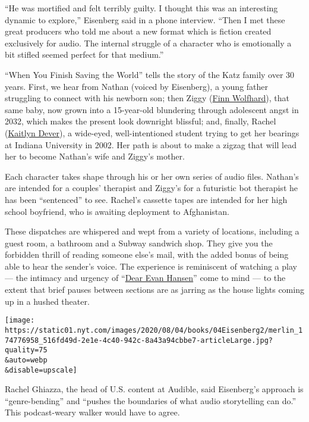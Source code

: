 ``He was mortified and felt terribly guilty. I thought this was an
interesting dynamic to explore,'' Eisenberg said in a phone interview.
``Then I met these great producers who told me about a new format which
is fiction created exclusively for audio. The internal struggle of a
character who is emotionally a bit stifled seemed perfect for that
medium.''

``When You Finish Saving the World'' tells the story of the Katz family
over 30 years. First, we hear from Nathan (voiced by Eisenberg), a young
father struggling to connect with his newborn son; then Ziggy
(\href{https://www.nytimes.com/2017/09/28/style/stranger-things-finn-wolfhard-rough-trade-vinyl.html}{Finn
Wolfhard}), that same baby, now grown into a 15-year-old blundering
through adolescent angst in 2032, which makes the present look downright
blissful; and, finally, Rachel
(\href{https://www.nytimes.com/2014/10/19/movies/kaitlyn-dever-talks-about-men-women-children.html}{Kaitlyn
Dever}), a wide-eyed, well-intentioned student trying to get her
bearings at Indiana University in 2002. Her path is about to make a
zigzag that will lead her to become Nathan's wife and Ziggy's mother.

Each character takes shape through his or her own series of audio files.
Nathan's are intended for a couples' therapist and Ziggy's for a
futuristic bot therapist he has been ``sentenced'' to see. Rachel's
cassette tapes are intended for her high school boyfriend, who is
awaiting deployment to Afghanistan.

These dispatches are whispered and wept from a variety of locations,
including a guest room, a bathroom and a Subway sandwich shop. They give
you the forbidden thrill of reading someone else's mail, with the added
bonus of being able to hear the sender's voice. The experience is
reminiscent of watching a play --- the intimacy and urgency of
``\href{https://www.nytimes.com/2016/12/04/theater/dear-evan-hansen-review.html}{Dear
Evan Hansen}'' come to mind --- to the extent that brief pauses between
sections are as jarring as the house lights coming up in a hushed
theater.

\texttt{[image: https://static01.nyt.com/images/2020/08/04/books/04Eisenberg2/merlin\_174776958\_516fd49d-2e1e-4c40-942c-8a43a94cbbe7-articleLarge.jpg?quality=75\\\&auto=webp\\\&disable=upscale]}

Rachel Ghiazza, the head of U.S. content at Audible, said Eisenberg's
approach is ``genre-bending'' and ``pushes the boundaries of what audio
storytelling can do.'' This podcast-weary walker would have to agree.

